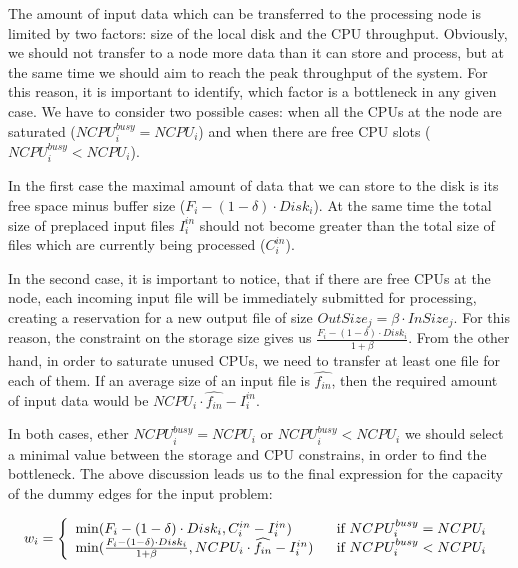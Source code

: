 \documentclass{svjour3}                     %
\begin{document}
The amount of input data which can be transferred to the processing node is limited by two factors: size of the local disk and the CPU throughput. Obviously, we should not transfer to a node more data than it can store and process, but at the same time we should aim to reach the peak throughput of the system. For this reason, it is important to identify, which factor is a bottleneck in any given case. We have to consider two possible cases: when all the CPUs at the node are saturated ($NCPU_{i}^{busy} = NCPU_{i}$) and when there are free CPU slots ($NCPU_{i}^{busy} < NCPU_{i}$). 

In the first case the maximal amount of data that we can store to the disk is its free space minus buffer size ($F_{i} -  (1 - \delta) \cdot Disk_{i}$). At the same time the total size of preplaced input files $I_{i}^{in}$ should not become greater than the total size of files which are currently being processed ($C_{i}^{in}$). 

In the second case, it is important to notice, that if there are free CPUs at the node, each incoming input file will be immediately submitted for processing, creating a reservation for a new output file of size  $OutSize_{j} = \beta \cdot InSize_{j}$. For this reason, the constraint on the storage size gives us $\frac{F_{i} -   (1 - \delta) \cdot Disk_{i}}{1 + \beta}$. From the other hand, in order to saturate unused CPUs, we need to transfer at least one file for each of them. If an average size of an input file is $\widehat{f_{in}}$, then the required amount of input data would be $NCPU_{i} \cdot \widehat{f_{in}} - I_{i}^{in}$. 

In both cases, ether $NCPU_{i}^{busy} = NCPU_{i}$ or $NCPU_{i}^{busy} < NCPU_{i}$ we should select a minimal value between the storage and CPU constrains, in order to find the bottleneck. The above discussion leads us to the final expression for the capacity of the dummy edges for the input problem:

\begin{equation}
w_{i} =\left\{ 
\begin{array}{l l}
\min(F_{i} -  (1 - \delta) \cdot Disk_{i} , 
C_{i}^{in} - I_{i}^{in}) & \ \ \text{if }  NCPU_{i}^{busy} = NCPU_{i} \\
\min(\frac{F_{i} -   (1 - \delta) \cdot Disk_{i}}{1 + \beta},
NCPU_{i} \cdot \widehat{f_{in}} - I_{i}^{in}) & \ \ \text{if }  NCPU_{i}^{busy} < NCPU_{i}

 \end{array} \right.
\label{w}
\end{equation}
\end{document}
